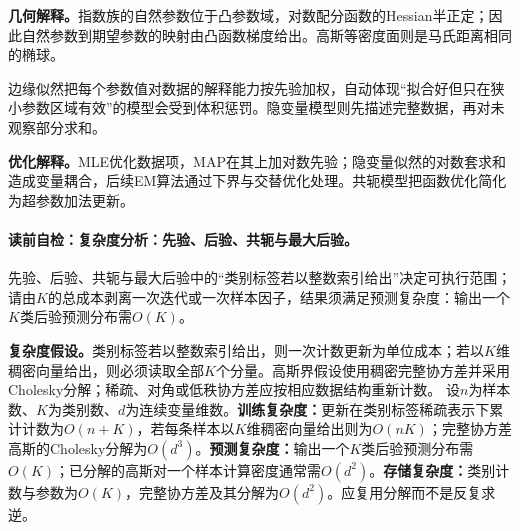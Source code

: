 \label{struct:V1-C05-CH10}
\label{struct:V1-C05-CH21}
\label{struct:V1-C05-CH22}
\label{struct:V1-C05-CH23}
\label{struct:V1-C05-CH24}
\label{struct:V1-C05-CH25}
\label{struct:V1-C05-CH26}
\label{struct:V1-C05-CH27}
\begin{geometrybox}
\textbf{几何解释。}指数族的自然参数位于凸参数域，对数配分函数的Hessian半正定；因此自然参数到期望参数的映射由凸函数梯度给出。高斯等密度面则是马氏距离相同的椭球。
\end{geometrybox}
\label{struct:V1-C05-CH17}
\begin{probabilitybox}
边缘似然把每个参数值对数据的解释能力按先验加权，自动体现“拟合好但只在狭小参数区域有效”的模型会受到体积惩罚。隐变量模型则先描述完整数据，再对未观察部分求和。
\end{probabilitybox}
\label{struct:V1-C05-CH18}
\begin{optimizationbox}
\textbf{优化解释。}MLE优化数据项，MAP在其上加对数先验；隐变量似然的对数套求和造成变量耦合，后续EM算法通过下界与交替优化处理。共轭模型把函数优化简化为超参数加法更新。
\end{optimizationbox}


\label{struct:V1-C05-CH28}
\label{struct:V1-C05-CH29}
\paragraph{读前自检：复杂度分析：先验、后验、共轭与最大后验。}先验、后验、共轭与最大后验中的“类别标签若以整数索引给出”决定可执行范围；请由$K$的总成本剥离一次迭代或一次样本因子，结果须满足预测复杂度：输出一个$K$类后验预测分布需$O(K)$。\par

\begin{complexitybox}
\textbf{复杂度假设。}类别标签若以整数索引给出，则一次计数更新为单位成本；若以$K$维稠密向量给出，则必须读取全部$K$个分量。高斯界假设使用稠密完整协方差并采用Cholesky分解；稀疏、对角或低秩协方差应按相应数据结构重新计数。
设$n$为样本数、$K$为类别数、$d$为连续变量维数。\textbf{训练复杂度：}\DirichletMultinomial{}更新在类别标签稀疏表示下累计计数为$O(n+K)$，若每条样本以$K$维稠密向量给出则为$O(nK)$；完整协方差高斯的Cholesky分解为$O(d^3)$。\textbf{预测复杂度：}输出一个$K$类后验预测分布需$O(K)$；已分解的高斯对一个样本计算密度通常需$O(d^2)$。\textbf{存储复杂度：}类别计数与参数为$O(K)$，完整协方差及其分解为$O(d^2)$。应复用分解而不是反复求逆。
\end{complexitybox}

